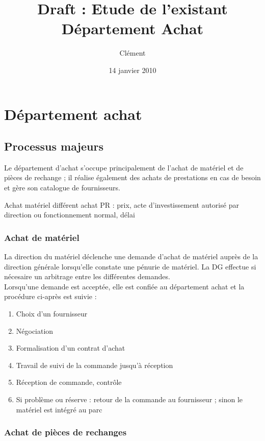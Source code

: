 \documentclass[a4paper]{article}
\title{Draft : Etude de l'existant\\Département Achat}
\author{Clément}
\date{14 janvier 2010}
\begin{document}
\maketitle

\section{Département achat}


\subsection{Processus majeurs}

Le département d'achat s'occupe principalement de l'achat de matériel et de
pièces de rechange ; il réalise également des achats de prestations en cas
de besoin et gère son catalogue de fournisseurs.

Achat matériel différent achat PR : prix, acte d'investissement autorisé
par direction ou fonctionnement normal, délai


\subsubsection{Achat de matériel}

La direction du matériel déclenche une demande d'achat de matériel auprès
de la direction générale lorsqu'elle constate une pénurie de matériel. La
DG effectue si nécesaire un arbitrage entre les différentes demandes.\\
Lorsqu'une demande est acceptée, elle est confiée au département achat et
la procédure ci-après est suivie :

\begin{enumerate}
\item Choix d'un fournisseur
\item Négociation
\item Formalisation d'un contrat d'achat
\item Travail de suivi de la commande jusqu'à réception
\item Réception de commande, contrôle
\item Si problème ou réserve : retour de la commande au fournisseur ; sinon
le matériel est intégré au parc
\end{enumerate}


\subsubsection{Achat de pièces de rechanges}
\end{document}
